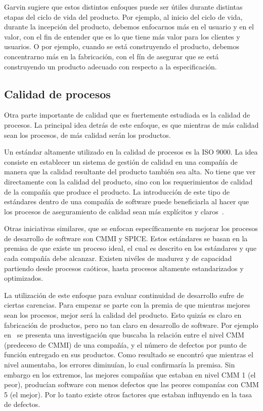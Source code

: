 Garvin sugiere que estos distintos enfoques puede ser útiles durante distintas
etapas del ciclo de vida del producto. Por ejemplo, al inicio del ciclo de 
vida, durante la incepción del producto, debemos enfocarnos más en el usuario
y en el valor, con el fin de entender que es lo que tiene más valor para
los clientes y usuarios. O por ejemplo, cuando se está construyendo el producto,
debemos concentrarno más en la fabricación, con el fín de asegurar que se está
construyendo un producto adecuado con respecto a la especificación.

\subsection{Calidad de procesos}
Otra parte importante de calidad que es fuertemente estudiada es la calidad de 
procesos. La principal idea detrás de este enfoque, es que mientras de más
calidad sean los procesos, de más calidad serán los productos.

Un estándar altamente utilizado en la calidad de procesos es la ISO 9000. La idea
consiste en establecer un sistema de gestión de calidad en una compañía de
manera que la calidad resultante del producto también sea alta. No tiene que ver
directamente con la calidad del producto, sino con los requerimientos de calidad
de la compañía que produce el producto. 
La introducción de este tipo de estándares dentro de una compañía de software
puede beneficiarla al hacer que los procesos de aseguramiento de calidad sean
más explícitos y claros~\cite{Wagner:2013}.

Otras iniciativas similares, que se enfocan específicamente en mejorar los
procesos de desarrollo de software son CMMI y SPICE.
Estos estándares se basan en la premisa de que existe un proceso ideal, 
el cual es descrito en los estándares y que cada compañía debe alcanzar.
Existen nivéles de madurez y de capacidad partiendo desde procesos caóticos,
hasta procesos altamente estandarizados y optimizados.

La utilización de este enfoque para evaluar continuidad de desarrollo sufre
de ciertas carencias. Para empezar se parte con la premia de que mientras
mejores sean los procesos, mejor será la calidad del producto. Esto quizás
es claro en fabricación de productos, pero no tan claro en desarrollo de
software. Por ejemplo en~\cite{Jones:2000:SAB:335582} se presenta una 
investigación que buscaba la relación entre el nivel CMM (predeceso de CMMI) 
de una compañía, y el número de defectos por punto de función entregado en sus productos.
Como resultado se encontró que mientras el nivel aumentaba, los errores diminuían,
lo cual confirmaría la premisa. Sin embargo en los extremos, las mejores
compañías que estaban en nivel CMM 1 (el peor), producían software con menos
defectos que las peores companías con CMM 5 (el mejor). Por lo tanto
existe otros factores que estaban influyendo en la tasa de defectos.

